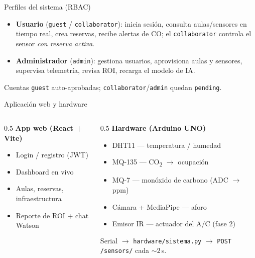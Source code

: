 \documentclass[aspectratio=169,11pt]{beamer}
\begin{document}
\begin{frame}{Perfiles del sistema (RBAC)}
  \begin{itemize}
    \item \textbf{Usuario} (\texttt{guest} / \texttt{collaborator}): inicia sesión,
      consulta aulas/sensores en tiempo real, crea reservas, recibe alertas de CO;
      el \texttt{collaborator} controla el sensor \emph{con reserva activa}.
    \item \textbf{Administrador} (\texttt{admin}): gestiona usuarios, aprovisiona
      aulas y sensores, supervisa telemetría, revisa ROI, recarga el modelo de IA.
  \end{itemize}
  \vfill
  \footnotesize Cuentas \texttt{guest} auto-aprobadas; \texttt{collaborator}/\texttt{admin} quedan \texttt{pending}.
\end{frame}

\begin{frame}{Aplicación web y hardware}
  \begin{columns}[T]
    \begin{column}{0.5\textwidth}
      \textbf{App web (React + Vite)}
      \begin{itemize}\small
        \item Login / registro (JWT)
        \item Dashboard en vivo
        \item Aulas, reservas, infraestructura
        \item Reporte de ROI + chat Watson
      \end{itemize}
    \end{column}
    \begin{column}{0.5\textwidth}
      \textbf{Hardware (Arduino UNO)}
      \begin{itemize}\small
        \item DHT11 --- temperatura / humedad
        \item MQ-135 --- CO\textsubscript{2} $\rightarrow$ ocupación
        \item MQ-7 --- monóxido de carbono (ADC $\rightarrow$ ppm)
        \item Cámara + MediaPipe --- aforo
        \item Emisor IR --- actuador del A/C (fase 2)
      \end{itemize}
      \footnotesize Serial $\rightarrow$ \texttt{hardware/sistema.py} $\rightarrow$ \texttt{POST /sensors/} cada ${\sim}2$\,s.
    \end{column}
  \end{columns}
\end{frame}
\end{document}
